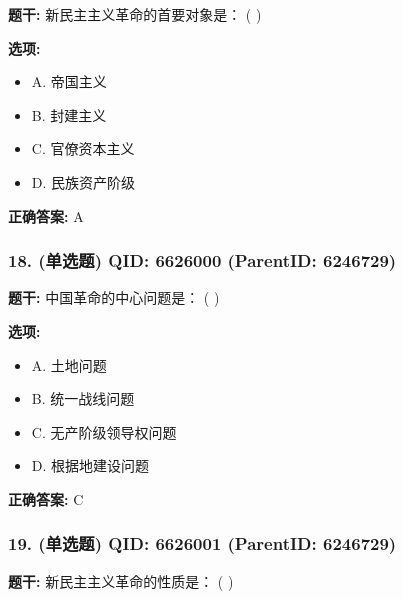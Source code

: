 \documentclass[12pt,UTF8]{ctexart}
\begin{document}
\textbf{题干:}
新民主主义革命的首要对象是： ( )



\textbf{选项:}
\begin{itemize}[leftmargin=*]

  \item A. 帝国主义

  \item B. 封建主义

  \item C. 官僚资本主义

  \item D. 民族资产阶级

\end{itemize}

\textbf{正确答案:}
A

\vspace{0.3em}\hrulefill\vspace{0.7em}

\subsubsection*{18. (单选题) \small QID: 6626000 (ParentID: 6246729)}

\textbf{题干:}
中国革命的中心问题是： ( )



\textbf{选项:}
\begin{itemize}[leftmargin=*]

  \item A. 土地问题

  \item B. 统一战线问题

  \item C. 无产阶级领导权问题

  \item D. 根据地建设问题

\end{itemize}

\textbf{正确答案:}
C

\vspace{0.3em}\hrulefill\vspace{0.7em}

\subsubsection*{19. (单选题) \small QID: 6626001 (ParentID: 6246729)}

\textbf{题干:}
新民主主义革命的性质是： ( )
\end{document}
